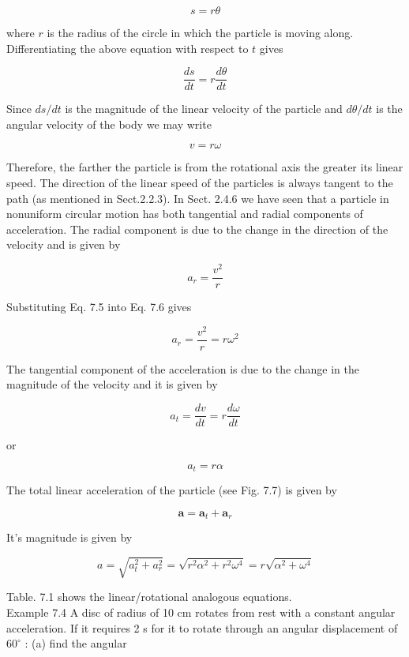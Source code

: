 \documentclass[10pt]{article}
\begin{document}
$$
s=r \theta
$$

where $r$ is the radius of the circle in which the particle is moving along. Differentiating the above equation with respect to $t$ gives

$$
\frac{d s}{d t}=r \frac{d \theta}{d t}
$$

Since $d s / d t$ is the magnitude of the linear velocity of the particle and $d \theta / d t$ is the angular velocity of the body we may write


\begin{equation*}
v=r \omega \tag{7.5}
\end{equation*}


Therefore, the farther the particle is from the rotational axis the greater its linear speed. The direction of the linear speed of the particles is always tangent to the path (as mentioned in Sect.2.2.3). In Sect. 2.4.6 we have seen that a particle in nonuniform circular motion has both tangential and radial components of acceleration. The radial component is due to the change in the direction of the velocity and is given by


\begin{equation*}
a_{r}=\frac{v^{2}}{r} \tag{7.6}
\end{equation*}


Substituting Eq. 7.5 into Eq. 7.6 gives

$$
a_{r}=\frac{v^{2}}{r}=r \omega^{2}
$$

The tangential component of the acceleration is due to the change in the magnitude of the velocity and it is given by

$$
a_{t}=\frac{d v}{d t}=r \frac{d \omega}{d t}
$$

or

$$
a_{t}=r \alpha
$$

The total linear acceleration of the particle (see Fig. 7.7) is given by

$$
\mathbf{a}=\mathbf{a}_{t}+\mathbf{a}_{r}
$$

It's magnitude is given by

$$
a=\sqrt{a_{t}^{2}+a_{r}^{2}}=\sqrt{r^{2} \alpha^{2}+r^{2} \omega^{4}}=r \sqrt{\alpha^{2}+\omega^{4}}
$$

Table. 7.1 shows the linear/rotational analogous equations.\\
Example 7.4 A disc of radius of 10 cm rotates from rest with a constant angular acceleration. If it requires 2 s for it to rotate through an angular displacement of $60^{\circ}$ : (a) find the angular
\end{document}
